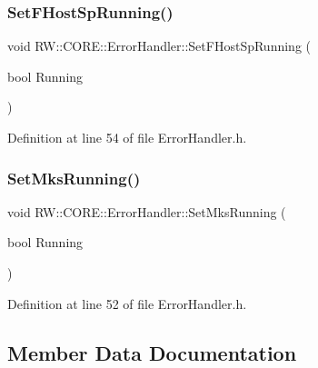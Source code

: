 \subsubsection{\texorpdfstring{Set\+F\+Host\+Sp\+Running()}{SetFHostSpRunning()}}
{\footnotesize\ttfamily void R\+W\+::\+C\+O\+R\+E\+::\+Error\+Handler\+::\+Set\+F\+Host\+Sp\+Running (\begin{DoxyParamCaption}\item[{bool}]{Running }\end{DoxyParamCaption})\hspace{0.3cm}{\ttfamily [inline]}}



Definition at line 54 of file Error\+Handler.\+h.

\hypertarget{class_r_w_1_1_c_o_r_e_1_1_error_handler_a1045b5b8cfce6f8476c4c61b6c797509}{}\label{class_r_w_1_1_c_o_r_e_1_1_error_handler_a1045b5b8cfce6f8476c4c61b6c797509} 
\subsubsection{\texorpdfstring{Set\+Mks\+Running()}{SetMksRunning()}}
{\footnotesize\ttfamily void R\+W\+::\+C\+O\+R\+E\+::\+Error\+Handler\+::\+Set\+Mks\+Running (\begin{DoxyParamCaption}\item[{bool}]{Running }\end{DoxyParamCaption})\hspace{0.3cm}{\ttfamily [inline]}}



Definition at line 52 of file Error\+Handler.\+h.



\subsection{Member Data Documentation}
\hypertarget{class_r_w_1_1_c_o_r_e_1_1_error_handler_a430b5c523f3b9fc33d49ff3c0c440db4}{}\label{class_r_w_1_1_c_o_r_e_1_1_error_handler_a430b5c523f3b9fc33d49ff3c0c440db4} 
